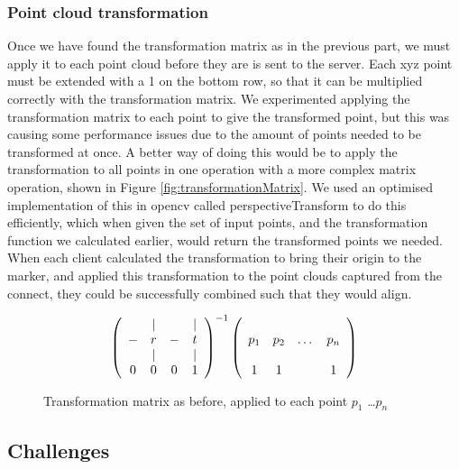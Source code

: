 \documentclass{article}
\begin{document}
\subsubsection{Point cloud transformation}
Once we have found the transformation matrix as in the previous part, we must apply it to each point cloud before they are is sent to the server. Each xyz point must be extended with a 1 on the bottom row, so that it can be multiplied correctly with the transformation matrix. We experimented applying the transformation matrix to each point to give the transformed point, but this was causing some performance issues due to the amount of points needed to be transformed at once. A better way of doing this would be to apply the transformation to all points in one operation with a more complex matrix operation, shown in Figure \ref{fig:transformationMatrix}. We used an optimised implementation of this in opencv called perspectiveTransform to do this efficiently, which when given the set of input points, and the transformation function we calculated earlier, would return the transformed points we needed. When each client calculated the transformation to bring their origin to the marker, and applied this transformation to the point clouds captured from the connect, they could be successfully combined such that they would align.\\
\begin{figure}[h]
  \[\left(\begin{array}{cccc}
      & | &   & | \\
    - & r & - & t \\ 
      & | &   & | \\
    0 & 0 & 0 & 1
    \end{array}\right)^{-1}
  \left(\begin{array}{cccc}
    \multirow{3}{*}{\textbf{$p_1$}} & \multirow{3}{*}{\textbf{$p_2$}} & \multirow{3}{*}{\dots} & \multirow{3}{*}{\textbf{$p_n$}} \\
    & & & \\
    & & & \\
    1 & 1 & & 1
    \end{array}\right)\]
  \caption{Transformation matrix as before, applied to each point $p_1$ \dots $p_n$}
  \label{fig:transformationApplication}
\end{figure}
\newpage
\subsection{Challenges}
\end{document}

